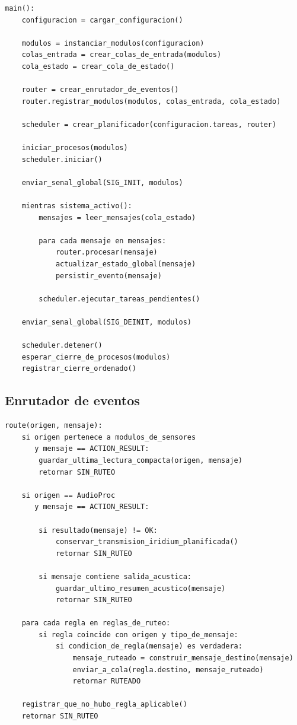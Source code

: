 \begin{lstlisting}[style=pseudocodigo, caption={Pseudocódigo de la coordinación central del sistema.}, label={lst:coordinacion_central}]
main():
    configuracion = cargar_configuracion()

    modulos = instanciar_modulos(configuracion)
    colas_entrada = crear_colas_de_entrada(modulos)
    cola_estado = crear_cola_de_estado()

    router = crear_enrutador_de_eventos()
    router.registrar_modulos(modulos, colas_entrada, cola_estado)

    scheduler = crear_planificador(configuracion.tareas, router)

    iniciar_procesos(modulos)
    scheduler.iniciar()

    enviar_senal_global(SIG_INIT, modulos)

    mientras sistema_activo():
        mensajes = leer_mensajes(cola_estado)

        para cada mensaje en mensajes:
            router.procesar(mensaje)
            actualizar_estado_global(mensaje)
            persistir_evento(mensaje)

        scheduler.ejecutar_tareas_pendientes()

    enviar_senal_global(SIG_DEINIT, modulos)

    scheduler.detener()
    esperar_cierre_de_procesos(modulos)
    registrar_cierre_ordenado()
\end{lstlisting}

\subsection{Enrutador de eventos}

\begin{lstlisting}[style=pseudocodigo, caption={Pseudocódigo simplificado del enrutador de eventos.}, label={lst:router_eventos}]
route(origen, mensaje):
    si origen pertenece a modulos_de_sensores
       y mensaje == ACTION_RESULT:
        guardar_ultima_lectura_compacta(origen, mensaje)
        retornar SIN_RUTEO

    si origen == AudioProc
       y mensaje == ACTION_RESULT:

        si resultado(mensaje) != OK:
            conservar_transmision_iridium_planificada()
            retornar SIN_RUTEO

        si mensaje contiene salida_acustica:
            guardar_ultimo_resumen_acustico(mensaje)
            retornar SIN_RUTEO

    para cada regla en reglas_de_ruteo:
        si regla coincide con origen y tipo_de_mensaje:
            si condicion_de_regla(mensaje) es verdadera:
                mensaje_ruteado = construir_mensaje_destino(mensaje)
                enviar_a_cola(regla.destino, mensaje_ruteado)
                retornar RUTEADO

    registrar_que_no_hubo_regla_aplicable()
    retornar SIN_RUTEO
\end{lstlisting}

